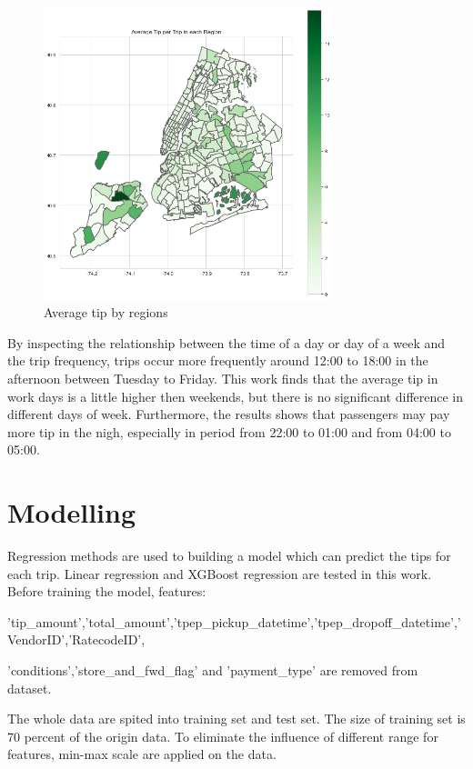 \documentclass[11pt]{article}
\begin{document}
\begin{figure}[h]
\begin{minipage}[t]{0.48\textwidth}
    \includegraphics[width=0.75\textwidth]{plots/map3.png}
    \caption{Average tip by regions}
\end{minipage}
\end{figure}


By inspecting the relationship between the time of a day or day of a week and the trip frequency, trips occur more frequently around 12:00 to 18:00 in the afternoon between Tuesday to Friday. This work finds that the average tip in work days is a little higher then weekends, but there is no significant difference in different days of week. Furthermore, the results shows that passengers may pay more tip in the nigh, especially in period from 22:00 to 01:00 and from 04:00 to 05:00.

\section{Modelling}

Regression methods are used to building a model which can predict the tips for each trip. Linear regression and XGBoost regression are tested in this work. Before training the model, features:

'tip\_{}amount','total\_{}amount','tpep\_{}pickup\_{}datetime','tpep\_{}dropoff\_{}datetime','VendorID','RatecodeID', 

'conditions','store\_{}and\_{}fwd\_{}flag' and 'payment\_{}type' are removed from dataset. 

The whole data are spited into training set and test set. The size of training set is 70 percent of the origin data. To eliminate the influence of different range for features, min-max scale are applied on the data.
\end{document}
